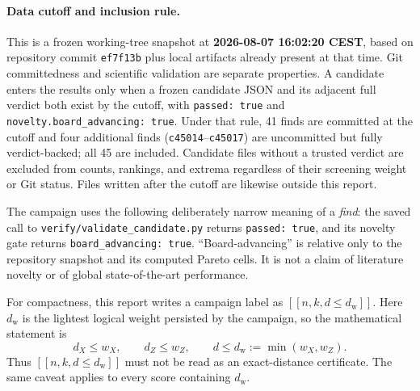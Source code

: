 \documentclass[11pt]{article}
\newcommand{\dw}{d_{\mathrm w}}
\newcommand{\qcode}[3]{\ensuremath{[\![#1,#2,d\!\leq\!#3]\!]}}
\newcommand{\pathcode}[1]{\nolinkurl{#1}}
\begin{document}
\paragraph{Data cutoff and inclusion rule.}
This is a frozen working-tree snapshot at \textbf{2026-08-07 16:02:20 CEST},
based on repository commit \pathcode{ef7f13b} plus local artifacts already
present at that time.  Git committedness and scientific validation are
separate properties.  A candidate enters the results only when a frozen
candidate JSON and its adjacent full verdict both exist by the cutoff, with
\pathcode{passed: true} and \pathcode{novelty.board_advancing: true}.  Under
that rule, 41 finds are committed at the cutoff and four additional finds
(\texttt{c45014}--\texttt{c45017}) are uncommitted but fully verdict-backed;
all 45 are included.  Candidate files without a trusted verdict are excluded
from counts, rankings, and extrema regardless of their screening weight or
Git status.  Files written after the cutoff are likewise outside this report.

The campaign uses the following deliberately narrow meaning of a
\emph{find}: the saved call to \pathcode{verify/validate_candidate.py} returns
\pathcode{passed: true}, and its novelty gate returns
\pathcode{board_advancing: true}.  ``Board-advancing'' is relative only to the
repository snapshot and its computed Pareto cells.  It is not a claim of
literature novelty or of global state-of-the-art performance.

For compactness, this report writes a campaign label as \qcode{n}{k}{\dw}.
Here $\dw$ is the lightest logical weight persisted by the campaign, so the
mathematical statement is
\[
  d_X\leq w_X,\qquad d_Z\leq w_Z,\qquad
  d\leq \dw:=\min(w_X,w_Z).
\]
Thus \qcode{n}{k}{\dw} must not be read as an exact-distance certificate.
The same caveat applies to every score containing $\dw$.
\end{document}
